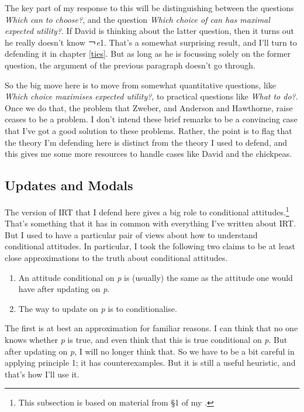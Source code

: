 \documentclass[
  11pt,
]{book}
\providecommand{\tightlist}{%
  \setlength{\itemsep}{0pt}\setlength{\parskip}{0pt}}
\begin{document}
The key part of my response to this will be distinguishing between the questions \emph{Which can to choose?}, and the question \emph{Which choice of can has maximal expected utility?}. If David is thinking about the latter question, then it turns out he really doesn't know ￢\emph{e}1. That's a somewhat surprising result, and I'll turn to defending it in chapter \ref{ties}. But as long as he is focussing solely on the former question, the argument of the previous paragraph doesn't go through.

So the big move here is to move from somewhat quantitative questions, like \emph{Which choice maximises expected utility?}, to practical questions like \emph{What to do?}. Once we do that, the problem that Zweber, and Anderson and Hawthorne, raise ceases to be a problem. I don't intend these brief remarks to be a convincing case that I've got a good solution to these problems. Rather, the point is to flag that the theory I'm defending here is distinct from the theory I used to defend, and this gives me some more resources to handle cases like David and the chickpeas.

\hypertarget{modalupdate}{%
\subsection{Updates and Modals}\label{modalupdate}}

The version of IRT that I defend here gives a big role to conditional attitudes.\footnote{This subsection is based on material from §1 of my \citeyearpar{Weatherson2016}.} That's something that it has in common with everything I've written about IRT. But I used to have a particular pair of views about how to understand conditional attitudes. In particular, I took the following two claims to be at least close approximations to the truth about conditional attitudes.

\begin{enumerate}
\def\labelenumi{\arabic{enumi}.}
\tightlist
\item
  An attitude conditional on \emph{p} is (usually) the same as the attitude one would have after updating on \emph{p}.
\item
  The way to update on \emph{p} is to conditionalise.
\end{enumerate}

The first is at best an approximation for familiar reasons. I can think that no one knows whether \emph{p} is true, and even think that this is true conditional on \emph{p}. But after updating on \emph{p}, I will no longer think that. So we have to be a bit careful in applying principle 1; it has counterexamples. But it is still a useful heuristic, and that's how I'll use it.
\end{document}
